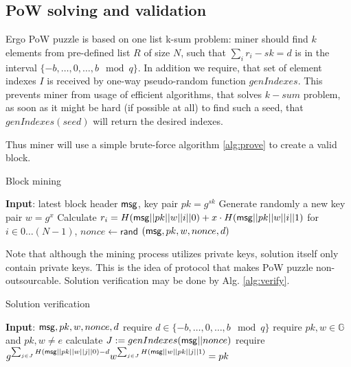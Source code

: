 \documentclass[]{llncs}
\begin{document}
    \subsection{PoW solving and validation}

    Ergo PoW puzzle is based on one list k-sum problem: miner should find
    $k$ elements from pre-defined list $R$ of size $N$, such that
    $\sum_{i} r_{i} - sk = d$ is in the interval $\{-b,\dots,0,\dots,b\mod q\}$.
    In addition we require, that set of element indexes $I$ is received
    by one-way pseudo-random function $genIndexes$. This prevents miner
    from usage of efficient algorithms, that solves $k-sum$ problem, as
    soon as it might be hard (if possible at all) to find such a seed,
    that $genIndexes(seed)$ will return the desired indexes.

    Thus miner will use a simple brute-force algorithm \ref{alg:prove} to
    create a valid block.

    \begin{algorithm}[H]
        \caption{Block mining}
        \label{alg:prove}
        \begin{algorithmic}[1]
            \State \textbf{Input}: latest block header $\mathsf{msg}$, key pair $pk=g^{sk}$
            \State Generate randomly a new key pair $w=g^x$
            \State Calculate $r_i=H(\mathsf{msg}||pk||w||i||0)+x\cdot H(\mathsf{msg}||pk||w||i||1)$ for $i\in 0\dots (N-1)$,
                \State $nonce\leftarrow\mathsf{rand}$
                \State \Return $(\mathsf{msg},pk,w,nonce,d)$
                \EndIf
            \EndWhile
        \end{algorithmic}
    \end{algorithm}

    Note that although the mining process utilizes private keys, solution itself
    only contain private keys. This is the idea of \Name protocol that makes
    PoW puzzle non-outsourcable. Solution verification may be done by Alg. \ref{alg:verify}.

    \begin{algorithm}[H]
        \caption{Solution verification}
        \label{alg:verify}
        \begin{algorithmic}[1]
            \State \textbf{Input}: $\mathsf{msg},pk,w,nonce,d$
            \State require $d\in\{-b,\dots,0,\dots, b\mod q\}$
            \State require $pk,w\in \mathbb{G}$ and $pk,w \ne e$
            \State calculate $J:=genIndexes(\mathsf{msg}||nonce)$
            \State require $g^{\sum_{j \in J} H(\mathsf{msg}||pk||w||j||0) - d}
            w^{\sum_{j \in J} H(\mathsf{msg}||w||pk||j||1)} = pk$
        \end{algorithmic}
    \end{algorithm}
\end{document}
